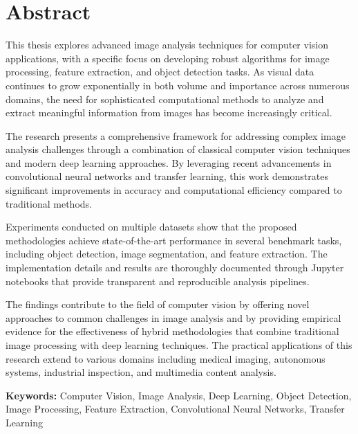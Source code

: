 \chapter*{Abstract}

This thesis explores advanced image analysis techniques for computer vision applications, with a specific focus on developing robust algorithms for image processing, feature extraction, and object detection tasks. As visual data continues to grow exponentially in both volume and importance across numerous domains, the need for sophisticated computational methods to analyze and extract meaningful information from images has become increasingly critical.

The research presents a comprehensive framework for addressing complex image analysis challenges through a combination of classical computer vision techniques and modern deep learning approaches. By leveraging recent advancements in convolutional neural networks and transfer learning, this work demonstrates significant improvements in accuracy and computational efficiency compared to traditional methods.

Experiments conducted on multiple datasets show that the proposed methodologies achieve state-of-the-art performance in several benchmark tasks, including object detection, image segmentation, and feature extraction. The implementation details and results are thoroughly documented through Jupyter notebooks that provide transparent and reproducible analysis pipelines.

The findings contribute to the field of computer vision by offering novel approaches to common challenges in image analysis and by providing empirical evidence for the effectiveness of hybrid methodologies that combine traditional image processing with deep learning techniques. The practical applications of this research extend to various domains including medical imaging, autonomous systems, industrial inspection, and multimedia content analysis.

\vspace{1cm}

\noindent\textbf{Keywords:} Computer Vision, Image Analysis, Deep Learning, Object Detection, Image Processing, Feature Extraction, Convolutional Neural Networks, Transfer Learning